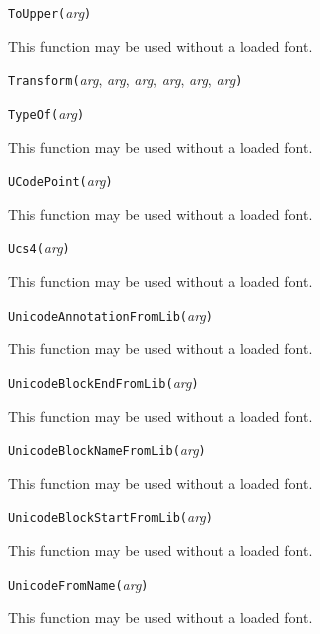 
\noindent\texttt{ToUpper(}\textit{arg}\texttt{)}

This function may be used without a loaded font.


\noindent\texttt{Transform(}\textit{arg}, \textit{arg}, \textit{arg}, \textit{arg}, \textit{arg}, \textit{arg}\texttt{)}


\noindent\texttt{TypeOf(}\textit{arg}\texttt{)}

This function may be used without a loaded font.


\noindent\texttt{UCodePoint(}\textit{arg}\texttt{)}

This function may be used without a loaded font.


\noindent\texttt{Ucs4(}\textit{arg}\texttt{)}

This function may be used without a loaded font.


\noindent\texttt{UnicodeAnnotationFromLib(}\textit{arg}\texttt{)}

This function may be used without a loaded font.


\noindent\texttt{UnicodeBlockEndFromLib(}\textit{arg}\texttt{)}

This function may be used without a loaded font.


\noindent\texttt{UnicodeBlockNameFromLib(}\textit{arg}\texttt{)}

This function may be used without a loaded font.


\noindent\texttt{UnicodeBlockStartFromLib(}\textit{arg}\texttt{)}

This function may be used without a loaded font.


\noindent\texttt{UnicodeFromName(}\textit{arg}\texttt{)}

This function may be used without a loaded font.


